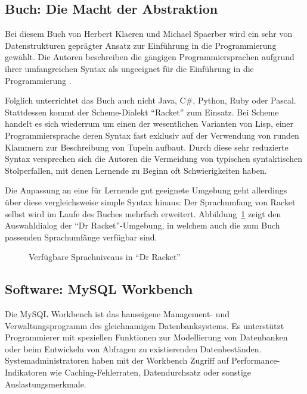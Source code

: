 \subsection{Buch: Die Macht der Abstraktion}

Bei diesem Buch von Herbert Klaeren und Michael Spaerber wird ein sehr von Datenstrukturen geprägter Ansatz zur Einführung in die Programmierung gewählt. Die Autoren beschreiben die gängigen Programmiersprachen aufgrund ihrer umfangreichen Syntax als ungeeignet für die Einführung in die Programmierung \cite[2]{macht-der-abstraktion}. 

Folglich unterrichtet das Buch auch nicht Java, C\#, Python, Ruby oder Pascal. Stattdessen kommt der Scheme-Dialekt "`Racket"' zum Einsatz. Bei Scheme handelt es sich wiederrum um einen der wesentlichen Varianten von Lisp, einer Programmiersprache deren Syntax fast exklusiv auf der Verwendung von runden Klammern zur Beschreibung von Tupeln aufbaut. Durch diese sehr reduzierte Syntax versprechen sich die Autoren die Vermeidung von typischen syntaktischen Stolperfallen, mit denen Lernende zu Beginn oft Schwierigkeiten haben.

Die Anpassung an eine für Lernende gut geeignete Umgebung geht allerdings über diese vergleichsweise simple Syntax hinaus: Der Sprachumfang von Racket selbst wird im Laufe des Buches mehrfach erweitert. Abbildung~\ref{fig:drracket-language-levels} zeigt den Auswahldialog der "`Dr Racket"'-Umgebung, in welchem auch die zum Buch passenden Sprachumfänge verfügbar sind.

\begin{figure}[h]
  \centering {}
  \caption{Verfügbare Sprachniveaus in "`Dr Racket"'}
  \label{fig:drracket-language-levels}
\end{figure}

\subsection{Software: MySQL Workbench}

Die MySQL Workbench ist das hauseigene Management- und Verwaltungsprogramm des gleichnamigen Datenbanksystems. Es unterstützt Programmierer mit speziellen Funktionen zur Modellierung von Datenbanken oder beim Entwickeln von Abfragen zu existierenden Datenbeständen. Systemadministratoren haben mit der Workbench Zugriff auf Performance-Indikatoren wie Caching-Fehlerraten, Datendurchsatz oder sonstige Auslastungsmerkmale.

